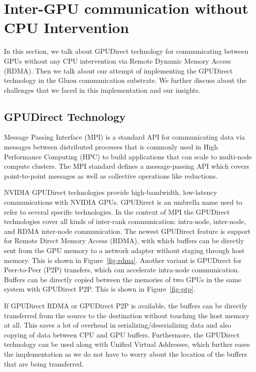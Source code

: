 \section{Inter-GPU communication without CPU Intervention}
In this section, we talk about GPUDirect technology for communicating between GPUs without any CPU intervention via Remote Dynamic Memory Access (RDMA). Then we talk about our attempt of implementing the GPUDirect technology in the Gluon communication substrate. We further discuss about the challenges that we faced in this implementation and our insights. 

\subsection{GPUDirect Technology}
Message Passing Interface (MPI) is a standard API for communicating data via messages between distributed processes that is commonly used in High Performance Computing (HPC) to build applications that can scale to multi-node compute clusters. The MPI standard defines a message-passing API which covers point-to-point messages as well as collective operations like reductions. 




NVIDIA GPUDirect technologies provide high-bandwidth, low-latency communications with NVIDIA GPUs. GPUDirect is an umbrella name used to refer to several specific technologies. In the context of MPI the GPUDirect technologies cover all kinds of inter-rank communication: intra-node, inter-node, and RDMA inter-node communication. The newest GPUDirect feature is support for Remote Direct Memory Access (RDMA), with which buffers can be directly sent from the GPU memory to a network adapter without staging through host memory. This is shown in Figure~\ref{fig-rdma}. Another variant is GPUDirect for Peer-to-Peer (P2P) transfers, which can accelerate intra-node communication. Buffers can be directly copied between the memories of two GPUs in the same system with GPUDirect P2P. This is shown in Figure~\ref{fig-ptp}. 

If GPUDirect RDMA or GPUDirect P2P is available, the buffers can be directly transferred from the source to the destination without touching the host memory at all. This saves a lot of overhead in serializing/deserializing data and also copying of data between CPU and GPU buffers. Furthermore, the GPUDirect technology can be used along with Unified Virtual Addresses, which further eases the implementation as we do not have to worry about the location of the buffers that are being transferred. 

